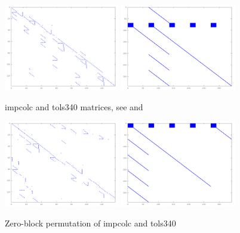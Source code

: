 \begin{figure}[!ht]
\centering
\includegraphics[width=0.45\textwidth]{./fig/perm/impcol_c_org.pdf}
\includegraphics[width=0.45\textwidth]{./fig/perm/tols340_org.pdf}
\caption{impcolc and tols340 matrices, see \cite{impcolcmtx} and \cite{tols340mtx}}
\label{gr3030}
\end{figure}

\begin{figure}[!ht]
\centering
\includegraphics[width=0.45\textwidth]{./fig/perm/impcol_c_zb.pdf}
\includegraphics[width=0.45\textwidth]{./fig/perm/tols340_zb.pdf}
\caption{Zero-block permutation of impcolc and tols340}
\label{gr3030}
\end{figure}
